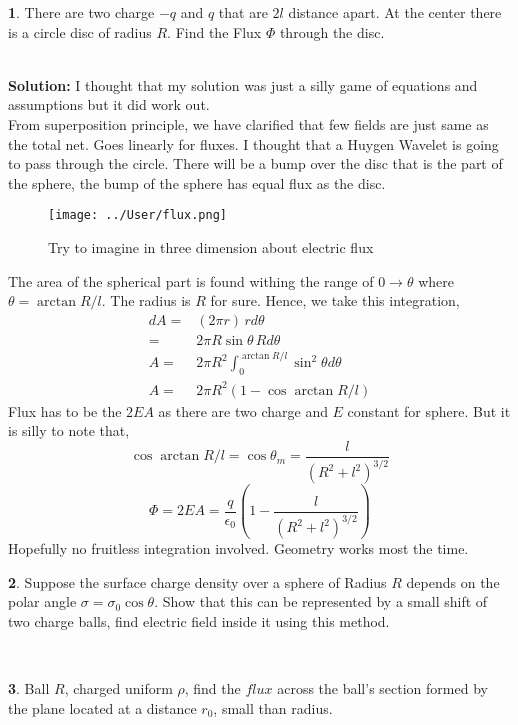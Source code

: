 \documentclass[a4paper]{article}
\theoremstyle{definition}
\newtheorem{prob}{ \framebox[0.09\textwidth]{{\sffamily Pr}} }
\newcommand{\pr}[1]{ \begin{tcolorbox} \begin{prob} 
    #1 
\end{prob} 
   \end{tcolorbox}\ 
   \\
 }
\begin{document}
\pr{There are two charge $-q$ and $q$ that are $2l$ distance apart. At
the center there is a circle disc of radius $R$. Find the Flux $\Phi$ through the disc.}
\textbf{Solution:} I thought that my solution was just a silly game of equations and assumptions but it did work out. \\
From superposition principle, we have clarified that few fields are just same as the total net. Goes linearly for fluxes. I thought that a Huygen Wavelet is going to pass through the circle. There will be a bump over the disc that is the part of the sphere, the bump of the sphere has equal flux as the disc. 
\begin{figure}[hbtp]
\centering
\texttt{[image: ../User/flux.png]}
\caption{Try to imagine in three dimension about electric flux}
\end{figure}

The area of the spherical part is found withing the range of $ 0 \rightarrow \theta$ where $\theta = \arctan R/l$. The radius is $R$ for sure. Hence, we take this integration, 
\begin{align*}
dA =& (2 \pi r) \, r d\theta \\
=& 2 \pi R \sin \theta \, R d \theta \\
A =& 2 \pi R^2 \int_{0}^{\arctan R/l} \sin^2 \theta d \theta \\
A =& 2 \pi R^2 \left(1 - \cos \arctan R/l \right) 
\end{align*}
Flux has to be the $2EA$ as there are two charge and $E$ constant for sphere. But it is silly to note that, 
\[ \cos \arctan R/l = \cos \theta _m = \frac{l}{(R^2 + l^2)^{3/2}} \]
\begin{equation}
\Phi = 2EA = \frac{q}{\epsilon _0} \left(1 -\frac{l}{(R^2 + l^2)^{3/2}} \right)
\end{equation}
Hopefully no fruitless integration involved. Geometry works most the time.
\pr{ Suppose the surface charge density over a sphere of Radius $R$ depends on the polar angle 
$ \sigma = \sigma _0 \cos \theta $. Show that this can be represented by a small shift of two charge balls, find electric field
inside it using this method.
}





\pr{ Ball $R$, charged uniform $\rho$, find the $flux$ across the ball's section formed by the plane located at a distance 
$r_0$, small than radius.}
\end{document}
